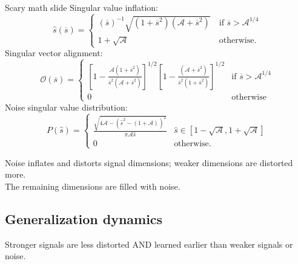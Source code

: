 \documentclass{beamer}
\begin{document}
\begin{frame}{Scary math slide}
Singular value inflation:
$$
\hat{s}(\overline{s}) = \begin{cases}
{(\overline{s})^{-1}}{\sqrt{(1+\overline{s}^2)(\mathcal{A}+\overline{s}^2)}}\ & \text{if } \overline{s} > \mathcal{A}^{1/4} \\
1+\sqrt{\mathcal{A}} & \text{otherwise}.
\end{cases}
$$
Singular vector alignment:
$$\mathcal{O}(\overline{s}) = 
\begin{cases}
\left[1-
        \frac{\mathcal{A}(1+\overline{s}^2)}          
            {\overline{s}^2(\mathcal{A}+\overline{s}^2)}
\right]^{1/2} 
\left[1-
        \frac{(\mathcal{A}+\overline{s}^2)}          
            {\overline{s}^2(1+\overline{s}^2)}
\right]^{1/2}

& \text{if } \overline{s} > \mathcal{A}^{1/4} \\
0 & \text{otherwise}
\end{cases}
$$
Noise singular value distribution:
$$P(\hat{s}) = \begin{cases}
\frac{\sqrt{4\mathcal{A}-(\hat{s}^2 - (1+\mathcal{A}))^2}}{\pi \mathcal{A}\hat{s}} & \hat{s} \in [1-\sqrt{\mathcal{A}}, 1+\sqrt{\mathcal{A}}] \\
0 & \text{otherwise}.
\end{cases}
$$
\end{frame}

\begin{frame}[standout]
Noise inflates and distorts signal dimensions; weaker dimensions are distorted more. \\[1em]
The remaining dimensions are filled with noise.
\end{frame}


\subsection{Generalization dynamics}

\begin{frame}[standout]
Stronger signals are less distorted AND learned earlier than weaker signals or noise.
\end{frame}
\end{document}
